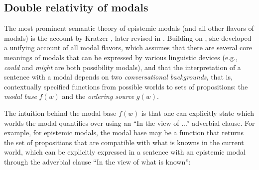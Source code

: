 








\subsection{Double relativity of modals}

The most prominent semantic theory of epistemic modals (and all other flavors of modals) is the account by Kratzer 
\cite{Kratzer1981,1991}, later revised in \cite{Kratzer2012}. Building on \cite{Lewis1973}, she developed a unifying 
account of all modal flavors, which assumes that there are several core meanings of modals that can be expressed 
by various linguistic devices (e.g., \textit{could} and \textit{might} are both possibility modals), and that the interpretation
of a sentence with a modal depends on two \textit{conversational backgrounds}, that is, contextually specified functions 
from possible worlds to sets of propositions: 
the \textit{modal base} $f(w)$ and the \textit{ordering source} $g(w)$. 

The intuition behind the modal base $f(w)$ is that one can explicitly state which worlds the modal quantifies over using an 
``In the view of ...'' adverbial clause. For example, for epistemic modals, the modal base may be a function that returns the set of propositions
that are compatible with what is knowns in the current world, which can be explicitly expressed in a sentence with an epistemic modal through the
adverbial clause ``In the view of what is known'':

